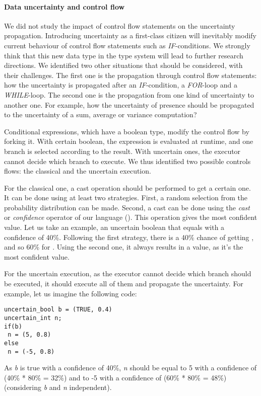 \paragraph{Data uncertainty and control flow}
We did not study the impact of control flow statements on the uncertainty propagation.
Introducing uncertainty as a first-class citizen will inevitably modify current behaviour of control flow statements such as \textit{IF}-conditions.
We strongly think that this new data type in the type system will lead to further research directions.
We identified two other situations that should be considered, with their challenges.
The first one is the propagation through control flow statements: how the uncertainty is propagated after an \textit{IF}-condition, a \textit{FOR}-loop and a \textit{WHILE}-loop.
The second one is the propagation from one kind of uncertainty to another one.
For example, how the uncertainty of presence should be propagated to the uncertainty of a sum, average or variance computation?

Conditional expressions, which have a boolean type, modify the control flow by forking it.
With certain boolean, the expression is evaluated at runtime, and one branch is selected according to the result.
With uncertain ones, the executor cannot decide which branch to execute.
We thus identified two possible controls flows: the classical and the uncertain execution.

For the classical one, a cast operation should be performed to get a certain one.
It can be done using at least two strategies.
First, a random selection from the probability distribution can be made.
Second, a cast can be done using the \textit{cast} or \textit{confidence} operator of our language (\cf {}).
This operation gives the most confident value.
Let us take an example, an uncertain boolean that equals \false{} with a confidence of 40\%.
Following the first strategy, there is a 40\% chance of getting \false{}, and so 60\% for	 \true{}.
Using the second one, it always results in a \true{} value, as it's the most confident value.

For the uncertain execution, as the executor cannot decide which branch should be executed, it should execute all of them and propagate the uncertainty.
For example, let us imagine the following code:

\begin{lstlisting}[style=pouetpouet2, caption=Example for uncertain control flow]
uncertain_bool b = (TRUE, 0.4)
uncertain_int n;
if(b)
 n = (5, 0.8)
else
 n = (-5, 0.8)
\end{lstlisting}
As \textit{b} is true with a confidence of 40\%, \textit{n} should be equal to 5 with a confidence of (40\% * 80\% = 32\%) and to -5 with a confidence of (60\% * 80\% = 48\%) (considering \textit{b} and \textit{n} independent).

